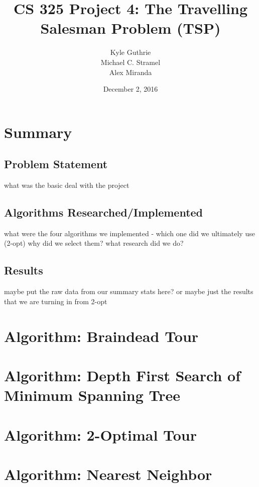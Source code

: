 \documentclass[12pt]{article}
\title{CS 325 Project 4: The Travelling Salesman Problem (TSP)}
\author{ Kyle Guthrie \\
         Michael C. Stramel \\
         Alex Miranda
}
\date{December 2, 2016}
\begin{document}
\maketitle

\newpage
\section*{Summary}
\subsection*{Problem Statement}

what was the basic deal with the project

\subsection*{Algorithms Researched/Implemented}

what were the four algorithms we implemented - which one did we ultimately use (2-opt)
why did we select them?
what research did we do?

\subsection*{Results}

maybe put the raw data from our summary stats here?  or maybe just the results that we are turning in from 2-opt

\newpage
\section*{Algorithm: Braindead Tour}


\newpage
\section*{Algorithm: Depth First Search of Minimum Spanning Tree}


\newpage
\section*{Algorithm: 2-Optimal Tour}


\newpage
\section*{Algorithm: Nearest Neighbor}

\end{document}
